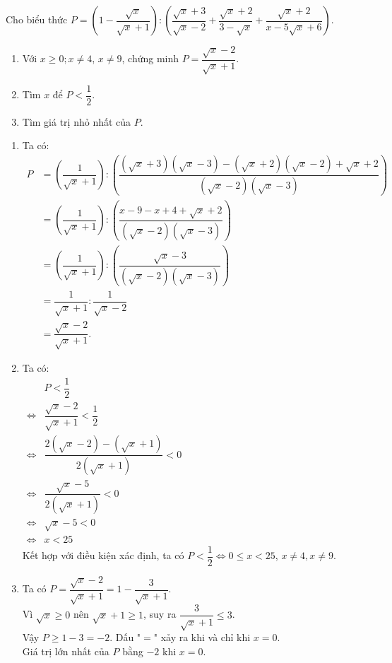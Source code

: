 \begin{ex} %
Cho biểu thức $P=\left( 1-\dfrac{\sqrt{x}}{\sqrt{x}+1} \right):\left( \dfrac{\sqrt{x}+3}{\sqrt{x}-2}+\dfrac{\sqrt{x}+2}{3-\sqrt{x}}+\dfrac{\sqrt{x}+2}{x-5\sqrt{x}+6} \right)$.
    \begin{enumerate}    
        \item Với $x\ge 0; x\ne 4$, $x\ne 9$, chứng minh $P=\dfrac{\sqrt{x}-2}{\sqrt{x}+1}$.
        \item Tìm $x$ để $P<\dfrac{1}{2}$.
        \item Tìm giá trị nhỏ nhất của $P$.
    \end{enumerate}
\loigiai
    {
    \begin{enumerate}
        \item Ta có: \\
        $
        \begin{aligned}
        P&=\left(\dfrac{1}{\sqrt{x}+1}\right) :\left(\dfrac{(\sqrt{x}+3)(\sqrt{x}-3)-(\sqrt{x}+2)(\sqrt{x}-2)+\sqrt{x}+2}{(\sqrt{x}-2)(\sqrt{x}-3)} \right)  \\
        &=\left(\dfrac{1}{\sqrt{x}+1}\right) :\left(\dfrac{x-9-x+4+\sqrt{x}+2}{(\sqrt{x}-2)(\sqrt{x}-3)} \right)\\
        &=\left(\dfrac{1}{\sqrt{x}+1}\right) :\left(\dfrac{\sqrt{x}-3}{(\sqrt{x}-2)(\sqrt{x}-3)} \right)\\
         &=\dfrac{1}{\sqrt{x}+1} :\dfrac{1}{\sqrt{x}-2}\\
        &=\dfrac{\sqrt{x}-2}{\sqrt{x}+1}.
        \end{aligned}
        $
        \item Ta có:\\
      $  \begin{aligned}
      & P<\dfrac{1}{2}\\
      \Leftrightarrow& \dfrac{\sqrt{x}-2}{\sqrt{x}+1}<\dfrac{1}{2}\\
      \Leftrightarrow & \dfrac{2(\sqrt{x}-2)-(\sqrt{x}+1)}{2(\sqrt{x}+1)}<0\\
       \Leftrightarrow & \dfrac{\sqrt{x}-5}{2(\sqrt{x}+1)}<0\\
        \Leftrightarrow & \sqrt{x}-5<0\\
         \Leftrightarrow & x<25
        \end{aligned}$\\
        Kết hợp với điều kiện xác định, ta có $P<\dfrac{1}{2}\Leftrightarrow 0\le x< 25$, $x\ne 4, x\ne 9$.
        \item Ta có $P=\dfrac{\sqrt{x}-2}{\sqrt{x}+1}=1-\dfrac{3}{\sqrt{x}+1}$.\\
        Vì $\sqrt{x}\ge 0$ nên $\sqrt{x}+1\ge 1$, suy ra $\dfrac{3}{\sqrt{x}+1}\le 3$.\\
        Vậy $P\ge 1-3=-2$. Dấu "$=$" xảy ra khi và chỉ khi $x=0$.\\
        Giá trị lớn nhất của $P$ bằng $-2$ khi $x=0$.  
        \end{enumerate}
    }
\end{ex}

